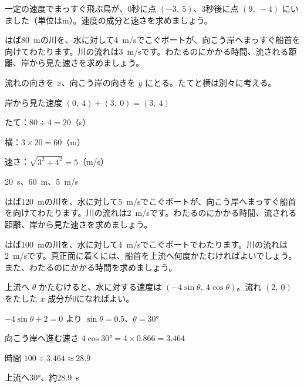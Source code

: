 \begin{jibun}
一定の速度でまっすぐ飛ぶ鳥が、0秒に点 $(-3,\ 5)$、3秒後に点 $(9,\ -4)$ にいました（単位はm）。速度の成分と速さを求めましょう。
\end{jibun}

\begin{reidai}[流れのある川をわたる]
はば\qty{80}{m}の川を、水に対して\qty{4}{m/s}でこぐボートが、向こう岸へまっすぐ船首を向けてわたります。川の流れは\qty{3}{m/s}です。わたるのにかかる時間、流される距離、岸から見た速さを求めましょう。\par
\kangaekata 流れの向きを $x$、向こう岸の向きを $y$ にとる。たてと横は別々に考える。\par
\shiki 岸から見た速度 $(0,\ 4)+(3,\ 0)=(3,\ 4)$\par
\hspace*{2.6\zw}たて：$80\div4=20$（s）\par
\hspace*{2.6\zw}横：$3\times20=60$（m）\par
\hspace*{2.6\zw}速さ：$\sqrt{3^2+4^2}=5$（m/s）\par
\kotae \qty{20}{s}、\qty{60}{m}、\qty{5}{m/s}
\end{reidai}

\begin{jibun}
はば\qty{120}{m}の川を、水に対して\qty{5}{m/s}でこぐボートが、向こう岸へまっすぐ船首を向けてわたります。川の流れは\qty{2}{m/s}です。わたるのにかかる時間、流される距離、岸から見た速さを求めましょう。
\end{jibun}

\begin{reidai}[真正面に着くように船首を向ける]
はば\qty{100}{m}の川を、水に対して\qty{4}{m/s}でこぐボートでわたります。川の流れは\qty{2}{m/s}です。真正面に着くには、船首を上流へ何度かたむければよいでしょう。また、わたるのにかかる時間を求めましょう。\par
\kangaekata 上流へ $\theta$ かたむけると、水に対する速度は $(-4\sin\theta,\ 4\cos\theta)$。流れ $(2,\ 0)$ をたした $x$ 成分が0になればよい。\par
\shiki $-4\sin\theta+2=0$ より $\sin\theta=0.5$、$\theta=30°$\par
\hspace*{2.6\zw}向こう岸へ進む速さ $4\cos30°=4\times0.866=3.464$\par
\hspace*{2.6\zw}時間 $100\div3.464\approx28.9$\par
\kotae 上流へ30°、約\qty{28.9}{s}
\end{reidai}

